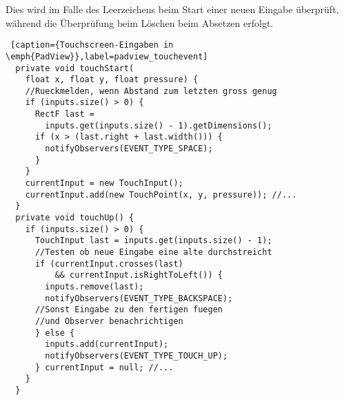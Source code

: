Dies wird im Falle des Leerzeichens beim Start einer neuen Eingabe überprüft, während die Überprüfung beim Löschen beim Absetzen erfolgt.

\begin{lstlisting} [caption={Touchscreen-Eingaben in \emph{PadView}},label=padview_touchevent]
  private void touchStart(
    float x, float y, float pressure) {
    //Rueckmelden, wenn Abstand zum letzten gross genug
    if (inputs.size() > 0) {
      RectF last = 
        inputs.get(inputs.size() - 1).getDimensions();
      if (x > (last.right + last.width())) {
        notifyObservers(EVENT_TYPE_SPACE);
      }
    }
    currentInput = new TouchInput();
    currentInput.add(new TouchPoint(x, y, pressure)); //...
  }
  private void touchUp() {
    if (inputs.size() > 0) {
      TouchInput last = inputs.get(inputs.size() - 1);
      //Testen ob neue Eingabe eine alte durchstreicht
      if (currentInput.crosses(last) 
          && currentInput.isRightToLeft()) {
        inputs.remove(last);
        notifyObservers(EVENT_TYPE_BACKSPACE);
      //Sonst Eingabe zu den fertigen fuegen 
      //und Observer benachrichtigen
      } else {
        inputs.add(currentInput);
        notifyObservers(EVENT_TYPE_TOUCH_UP);
      } currentInput = null; //...
    }
  }
\end{lstlisting}

